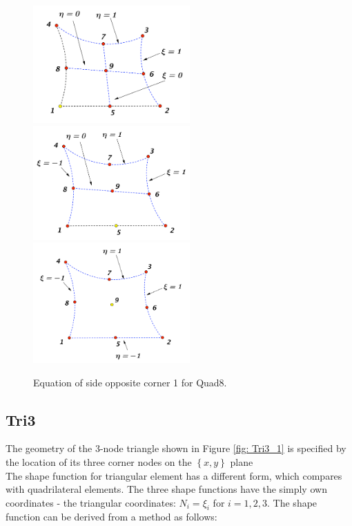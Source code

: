 \begin{figure}[h]
	\begin{center}
		\includegraphics[width=6cm,clip]{Quad8_2.pdf} 
		\includegraphics[width=6cm,clip]{Quad8_3.pdf}	
		\includegraphics[width=6cm,clip]{Quad8_4.pdf}
		\caption{Equation of side opposite corner 1 for Quad8.} \label{fig: Quad8_2}	
	\end{center} 
\end{figure}

\subsection{Tri3}
The geometry of the 3-node triangle shown in Figure \ref{fig: Tri3_1} is specified by the location of its three corner nodes on the $\left\{x, y\right\}$ plane \\

The shape function for triangular element has a different form, which compares with quadrilateral elements. The three shape functions have the simply own coordinates - the triangular coordinates: $N_i = \xi_i$ for $i = 1, 2, 3.$ The shape function can be derived from a method as follows: \\

